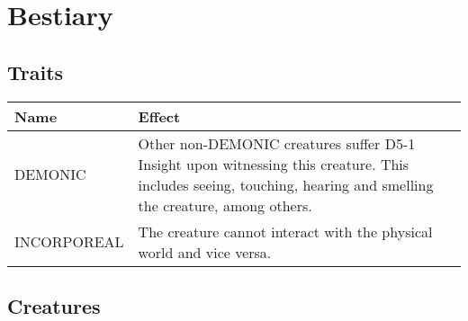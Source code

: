 \section{Bestiary}
\subsection{Traits}
\begin{tabularx}{\columnwidth}{l|X}
	Name & Effect \\ \hline
	DEMONIC & Other non-DEMONIC creatures suffer D5-1 Insight upon witnessing this creature. 
	This includes seeing, touching, hearing and smelling the creature, among others. \\
	\hline
	INCORPOREAL & The creature cannot interact with the physical world and vice versa.
\end{tabularx}

\subsection{Creatures}
